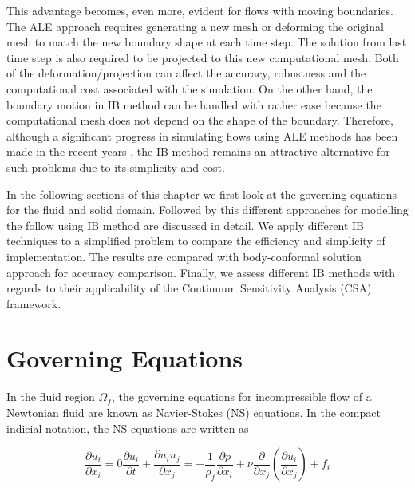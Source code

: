 This advantage becomes, even more, evident for flows with moving boundaries. The ALE approach requires generating a new mesh or deforming the original mesh to match the new boundary shape at each time step. The solution from last time step is also required to be projected to this new computational mesh. Both of the deformation/projection can affect the accuracy, robustness and the computational cost associated with the simulation. On the other hand, the boundary motion in IB method can be handled with rather ease because the computational mesh does not depend on the shape of the boundary. Therefore, although a significant progress in simulating flows using ALE methods has been made in the recent years \cite{lomtev1999discontinuous, farhat2004cfd, cheng2005fluid}, the IB method remains an attractive alternative for such problems due to its simplicity and cost.

In the following sections of this chapter we first look at the governing equations for the fluid and solid domain. Followed by this different approaches for modelling the follow using IB method are discussed in detail. We apply different IB techniques to a simplified problem to compare the efficiency and simplicity of implementation. The results are compared with body-conformal solution approach for accuracy comparison. Finally, we assess different IB methods with regards to their applicability of the Continuum Sensitivity Analysis (CSA) framework.

\section{Governing Equations}
In the fluid region $\Omega_f$, the governing equations for incompressible flow of a Newtonian fluid are known as Navier-Stokes (NS) equations. In the compact indicial notation, the NS equations are written as

\begin{subequations}\label{eq:C3_GE}
\begin{equation}\label{eq:C3_continuity}
    \frac{\partial u_i}{\partial x_i} = 0
\end{equation}
\begin{equation}\label{eq:C3_momentum}
    \frac{\partial u_i}{\partial t} + \frac{\partial u_i u_j}{\partial x_j} = 
    -\frac{1}{\rho_f    } \frac{\partial p}{\partial x_i} + 
    \nu \frac{\partial}{\partial x_j} \left( \frac{\partial u_i}{\partial x_j} \right) + 
    f_i
\end{equation}
\end{subequations}


